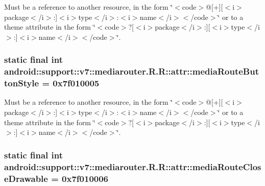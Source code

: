 Must be a reference to another resource, in the form \char`\"{}$<$code$>$@\mbox{[}+\mbox{]}\mbox{[}$<$i$>$package$<$/i$>$:\mbox{]}$<$i$>$type$<$/i$>$:$<$i$>$name$<$/i$>$$<$/code$>$\char`\"{} or to a theme attribute in the form \char`\"{}$<$code$>$?\mbox{[}$<$i$>$package$<$/i$>$:\mbox{]}\mbox{[}$<$i$>$type$<$/i$>$:\mbox{]}$<$i$>$name$<$/i$>$$<$/code$>$\char`\"{}. \hypertarget{classandroid_1_1support_1_1v7_1_1mediarouter_1_1_r_1_1attr_099e644d48a517581001a0315b603770}{
\subsubsection[{mediaRouteButtonStyle}]{\setlength{\rightskip}{0pt plus 5cm}static final int android::support::v7::mediarouter.R.R::attr::mediaRouteButtonStyle = 0x7f010005}}
\label{classandroid_1_1support_1_1v7_1_1mediarouter_1_1_r_1_1attr_099e644d48a517581001a0315b603770}


Must be a reference to another resource, in the form \char`\"{}$<$code$>$@\mbox{[}+\mbox{]}\mbox{[}$<$i$>$package$<$/i$>$:\mbox{]}$<$i$>$type$<$/i$>$:$<$i$>$name$<$/i$>$$<$/code$>$\char`\"{} or to a theme attribute in the form \char`\"{}$<$code$>$?\mbox{[}$<$i$>$package$<$/i$>$:\mbox{]}\mbox{[}$<$i$>$type$<$/i$>$:\mbox{]}$<$i$>$name$<$/i$>$$<$/code$>$\char`\"{}. \hypertarget{classandroid_1_1support_1_1v7_1_1mediarouter_1_1_r_1_1attr_3abe369dcb84554a20c4f75ff86b96db}{
\subsubsection[{mediaRouteCloseDrawable}]{\setlength{\rightskip}{0pt plus 5cm}static final int android::support::v7::mediarouter.R.R::attr::mediaRouteCloseDrawable = 0x7f010006}}
\label{classandroid_1_1support_1_1v7_1_1mediarouter_1_1_r_1_1attr_3abe369dcb84554a20c4f75ff86b96db}


